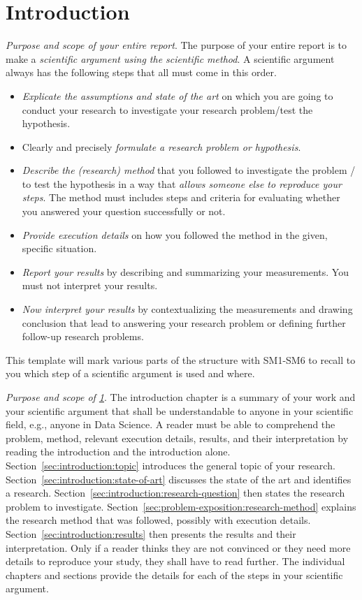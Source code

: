 \chapter{Introduction}\label{sec:introduction}

\emph{Purpose and scope of your entire report}.
The purpose of your entire report is to make a \emph{scientific argument using the scientific method}.
A scientific argument always has the following steps that all must come in this order.
%
\begin{itemize}
  \item[SM1] \emph{Explicate the assumptions and state of the art} on which you are going to conduct your research to investigate your research problem/test the hypothesis.
  \item[SM2] Clearly and precisely \emph{formulate a research problem or hypothesis}.
  \item[SM3] \emph{Describe the (research) method} that you followed to investigate the problem / to test the hypothesis in a way that \emph{allows someone else to reproduce your steps}.
        The method must includes steps and criteria for evaluating whether you answered your question successfully or not.
  \item[SM4] \emph{Provide execution details} on how you followed the method in the given, specific situation.
  \item[SM5] \emph{Report your results} by describing and summarizing your measurements.
        You must not interpret your results.
  \item[SM6] \emph{Now interpret your results} by contextualizing the measurements and drawing conclusion that lead to answering your research problem or defining further follow-up research problems.
\end{itemize}
%
This template will mark various parts of the structure with SM1-SM6 to recall to you which step of a scientific argument is used and where.

\emph{Purpose and scope of \cref{sec:introduction}}.
The introduction chapter is a summary of your work and your scientific argument that shall be understandable to anyone in your scientific field, e.g., anyone in Data Science.
A reader must be able to comprehend the problem, method, relevant execution details, results, and their interpretation by reading the introduction and the introduction alone.
Section~\ref{sec:introduction:topic} introduces the general topic of your research.
Section~\ref{sec:introduction:state-of-art} discusses the state of the art and identifies a research.
Section~\ref{sec:introduction:research-question} then states the research problem to investigate.
Section~\ref{sec:problem-exposition:research-method} explains the research method that was followed, possibly with execution details.
Section~\ref{sec:introduction:results} then presents the results and their interpretation.
Only if a reader thinks they are not convinced or they need more details to reproduce your study, they shall have to read further.
The individual chapters and sections provide the details for each of the steps in your scientific argument.

